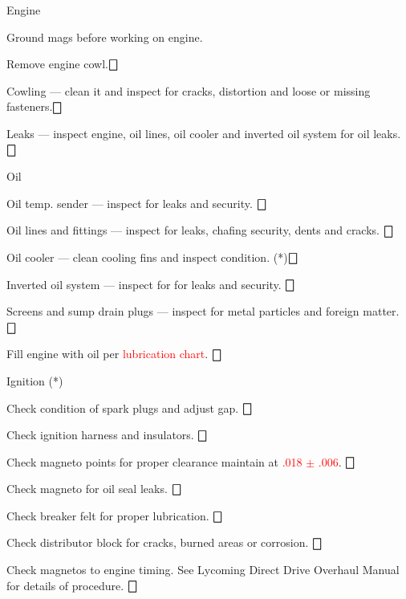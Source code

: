 \begin{enumerate*}
	\item{Engine} 
	\begin{Note}
		[WARNING] \centering Ground mags before working on engine. 
	\end{Note}
	\begin{enumerate*}
		\item Remove engine cowl.\dotfill $\bigbox$
		\item Cowling --- clean it and inspect for cracks, distortion and loose or missing fasteners.\dotfill $\bigbox$
		\item Leaks --- inspect engine, oil lines, oil cooler and inverted oil system for oil leaks.\dotfill $\bigbox$
		\item Oil 
		\begin{enumerate*}
			\item Oil temp. sender --- inspect for leaks and security. \dotfill $\bigbox$
			\item Oil lines and fittings --- inspect for leaks, chafing security, dents and cracks. \dotfill $\bigbox$
			\item Oil cooler --- clean cooling fins and inspect condition.  (*)\dotfill $\bigbox$
			\item Inverted oil system --- inspect for for leaks and security. \dotfill $\bigbox$
			\item Screens and sump drain plugs --- inspect for metal particles and foreign matter. \dotfill $\bigbox$
			\item Fill engine with oil per \textcolor{red}{lubrication chart}. \dotfill $\bigbox$
		\end{enumerate*}
		\item Ignition (*)
		\begin{enumerate*}
			\item Check condition of spark plugs and adjust gap. \dotfill $\bigbox$
			\item Check ignition harness and insulators. \dotfill $\bigbox$
			\item Check magneto points for proper clearance maintain at \textcolor{red}{.018 $\pm $ .006}. \dotfill $\bigbox$
			\item Check magneto for oil seal leaks. \dotfill $\bigbox$
			\item Check breaker felt for proper lubrication. \dotfill $\bigbox$
			\item Check distributor block for cracks, burned areas or corrosion. \dotfill $\bigbox$
			\item Check magnetos to engine timing. See Lycoming Direct Drive Overhaul Manual for details of procedure. \dotfill $\bigbox$

\end{enumerate*}
\end{enumerate*}
\end{enumerate*}
